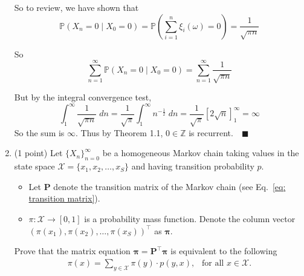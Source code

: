 \documentclass[11pt,letterpaper, leqno]{article}
\numberwithin{equation}{section}
\numberwithin{theorem}{section}
\numberwithin{lemma}{section}
\numberwithin{corollary}{section}
\numberwithin{definition}{section}
\numberwithin{proposition}{section}
\numberwithin{remark}{section}
\numberwithin{example}{section}
\newcommand{\T}{\intercal}
\newcommand{\Z}{\mathbb{Z}}
\renewcommand{\P}{\mathbb{P}}
\renewcommand{\qed}{\quad \blacksquare}
\begin{document}
\begin{enumerate}
            So to review, we have shown that 
            \[\P(X_n = 0 \; | \; X_0 =0) = \P\left(\sum_{i=1}^n \xi_i(\omega) = 0\right) = \frac{1}{\sqrt{\pi n}} \]

            So 
            \[\sum_{n=1}^\infty \P(X_n = 0 \; | \; X_0 = 0) = \sum_{n=1}^\infty \frac{1}{\sqrt{\pi n}}\]

            But by the integral convergence test, 
            \[\int_1^{\infty} \frac{1}{\sqrt{\pi n}} \; dn= \frac{1}{\sqrt \pi} \int_1^{\infty} n^{-\frac{1}{2}} \; dn = \frac{1}{\sqrt \pi} [2\sqrt n]_1^\infty = \infty\]
            So the sum is $\infty$. Thus by Theorem 1.1, $0 \in \Z$ is recurrent.$\qed$
        \color{black}
        
    \pagebreak

    \item (1 point) Let $\{X_n\}_{n=0}^\infty$ be a homogeneous Markov chain taking values in the state space $\mathcal{X}=\{x_1, x_2,\ldots, x_S\}$ and having transition probability $p$. %
    \begin{itemize}
        \item Let $\boldsymbol{P}$ denote the transition matrix of the Markov chain (see Eq.~\eqref{eq: transition matrix}).
        \item $\pi: \mathcal{X}\rightarrow[0,1]$ is a probability mass function. Denote the column vector $(\pi(x_1), \pi(x_2),\ldots, \pi(x_S))^\T$ as $\boldsymbol{\pi}$.
    \end{itemize}
    Prove that the matrix equation $\boldsymbol{\pi}=\boldsymbol{P}^\T \boldsymbol{\pi}$ is equivalent to the following
    \begin{align*}
        \pi(x)=\sum_{y\in\mathcal{X}}\pi(y)\cdot p(y,x),\ \ \mbox{ for all }x\in\mathcal{X}.
    \end{align*}


\end{enumerate}
\end{document}
